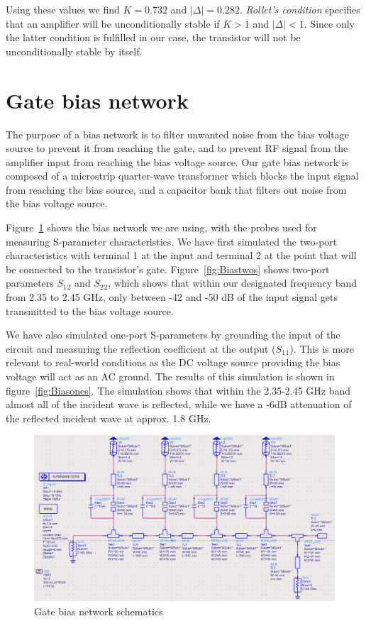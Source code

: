   Using these values we find $K = 0.732$ and $\lvert \Delta \rvert = 0.282$. \emph{Rollet's condition} specifies that an amplifier will be unconditionally stable if $K > 1$ and $\lvert \Delta \rvert < 1$. Since only the latter condition is fulfilled in our case, the transistor will not be unconditionally stable by itself.


  \section{Gate bias network}
  The purpose of a bias network is to filter unwanted noise from the bias voltage source to prevent it from reaching the gate, and to prevent RF signal from the amplifier input from reaching the bias voltage source. Our gate bias network is composed of a microstrip quarter-wave transformer which blocks the input signal from reaching the bias source, and a capacitor bank that filters out noise from the bias voltage source.

  Figure~\ref{fig:Biasschem} shows the bias network we are using, with the probes used for measuring S-parameter characteristics. We have first simulated the two-port characteristics with terminal 1 at the input and terminal 2 at the point that will be connected to the transistor's gate. Figure~\ref{fig:Biastwos} shows two-port parameters $S_1$$_2$ and $S_2$$_2$, which shows that within our designated frequency band from 2.35 to 2.45 GHz, only between -42 and -50 dB of the input signal gets transmitted to the bias voltage source.

  We have also simulated one-port S-parameters by grounding the input of the circuit and measuring the reflection coefficient at the output ($S_1$$_1$). This is more relevant to real-world conditions as the DC voltage source providing the bias voltage will act as an AC ground. The results of this simulation is shown in figure~\ref{fig:Biasones}. The simulation shows that within the 2.35-2.45 GHz band almost all of the incident wave is reflected, while we have a -6dB attenuation of the reflected incident wave at approx. 1.8 GHz.

  \begin{figure}[h]
	  \label{fig:Biasschem}
	  \centering
	  \includegraphics[width=\textwidth]{img/Bias_filter_two_port}
	  \caption{Gate bias network schematics}
  \end{figure}

